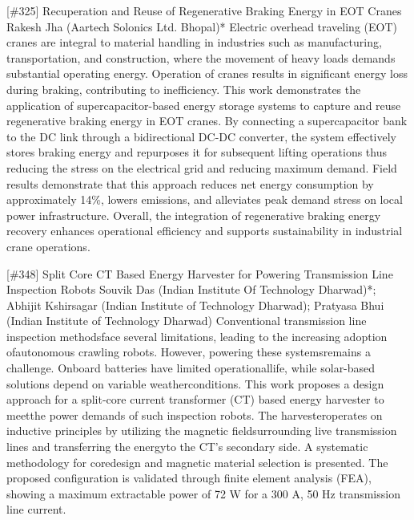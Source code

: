 {} \begin{abstract_online} {[\#325] Recuperation and Reuse of Regenerative Braking Energy in EOT Cranes} {} {Rakesh  Jha (Aartech Solonics Ltd. Bhopal)*} {}  Electric overhead traveling (EOT) cranes are integral to material handling in industries such as manufacturing, transportation, and construction, where the movement of heavy loads demands substantial operating energy. Operation of cranes results in significant energy loss during braking, contributing to inefficiency. This work demonstrates the application of supercapacitor-based energy storage systems to capture and reuse regenerative braking energy in EOT cranes. By connecting a supercapacitor bank to the DC link through a bidirectional DC-DC converter, the system effectively stores braking energy and repurposes it for subsequent lifting operations thus reducing the stress on the electrical grid and reducing maximum demand. Field results demonstrate that this approach reduces net energy consumption by approximately 14\%, lowers emissions, and alleviates peak demand stress on local power infrastructure. Overall, the integration of regenerative braking energy recovery enhances operational efficiency and supports sustainability in industrial crane operations. \end{abstract_online} 
{} \begin{abstract_online} {[\#348] Split Core CT Based Energy Harvester for Powering Transmission Line Inspection Robots} {} {Souvik  Das (Indian Institute Of Technology Dharwad)*; Abhijit  Kshirsagar (Indian Institute of Technology Dharwad); Pratyasa Bhui (Indian Institute of Technology Dharwad)} {} Conventional transmission line inspection methodsface several limitations, leading to the increasing adoption ofautonomous crawling robots. However, powering these systemsremains a challenge. Onboard batteries have limited operationallife, while solar-based solutions depend on variable weatherconditions. This work proposes a design approach for a split-core current transformer (CT) based energy harvester to meetthe power demands of such inspection robots. The harvesteroperates on inductive principles by utilizing the magnetic fieldsurrounding live transmission lines and transferring the energyto the CT's secondary side. A systematic methodology for coredesign and magnetic material selection is presented. The proposed configuration is validated through finite element analysis (FEA), showing a maximum extractable power of 72 W for a 300 A, 50 Hz transmission line current. \end{abstract_online} 
